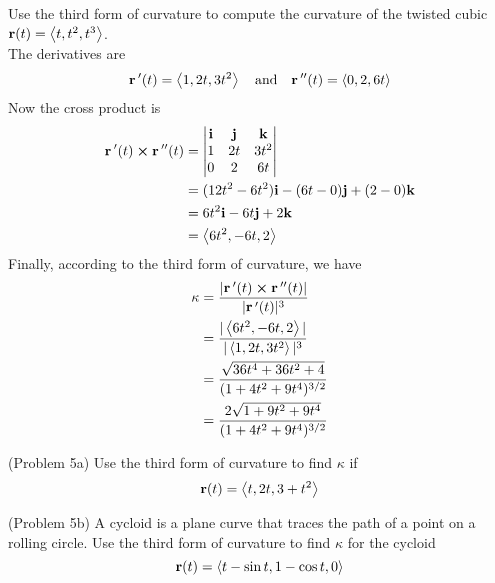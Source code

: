 \documentclass[handout]{ximera}
\begin{document}
\begin{example}[Example 5]
Use the third form of curvature to compute the curvature of the twisted cubic $\mathbf r(t) = \left\langle t, t^2, t^3\right\rangle$.\\
The derivatives are
\[
\mathbf r\,'(t) = \left\langle 1, 2t, 3t^2\right\rangle \quad \text{and} \quad \mathbf r\,''(t) = \left\langle 0, 2, 6t\right\rangle
\]
Now the cross product is
 \begin{align*}
 \mathbf  r\,'(t) \boldsymbol\times \mathbf r\,''(t) &= 
 \begin{vmatrix}
\mathbf{i} & \mathbf{j} & \mathbf{k}\\
1 & 2t & 3t^2\\
0 & 2 & 6t
\end{vmatrix}\\
&= (12t^2 - 6t^2) \mathbf{i} - (6t - 0) \mathbf{j} + (2-0) \mathbf{k}\\
 &=6t^2 \mathbf{i} -6t \mathbf{j} + 2 \mathbf{k}\\
 &=\left\langle 6t^2, - 6t, 2\right\rangle
 \end{align*}
Finally, according to the third form of curvature, we have
\begin{align*}
\kappa &=  \frac{|\mathbf r\,'(t) \boldsymbol\times \mathbf r\,''(t)|}{|\mathbf r\,'(t)|^3}\\
       &=  \frac{|\left\langle 6t^2,  -6t, 2\right\rangle|}{|\left\langle 1, 2t, 3t^2\right\rangle|^3}\\
       &= \frac{\sqrt{36t^4 + 36t^2 + 4}}{(1 + 4t^2 + 9t^4)^{3/2}}\\
       &= \frac{2\sqrt{1 + 9t^2 + 9t^4}}{(1 + 4t^2 + 9t^4)^{3/2}}
\end{align*}
\end{example}

\begin{problem}(Problem 5a)
Use the third form of curvature to find $\kappa$ if 
\[
\mathbf r(t) = \left\langle t, 2t, 3+t^2\right\rangle
\]

\begin{multipleChoice}
\end{multipleChoice}

\end{problem}

\begin{problem}(Problem 5b)
A cycloid is a plane curve that traces the path of a point on a rolling circle.
Use the third form of curvature to find $\kappa$ for the cycloid 
\[
\mathbf r(t) = \left\langle t - \sin t, 1 - \cos t, 0\right\rangle
\]

\begin{multipleChoice}
\end{multipleChoice}

\end{problem}
\end{document}
